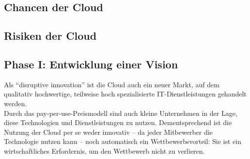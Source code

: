 \subsection{Chancen der Cloud}

\subsection{Risiken der Cloud}




\subsection{Phase I: Entwicklung einer Vision}
\label{cha:phaseI}

Als "`disruptive innovation"' ist die Cloud auch ein neuer Markt, auf dem 
qualitativ hochwertige, teilweise hoch spezialisierte IT-Dienstleistungen 
gehandelt werden. 
 \\
Durch das pay-per-use-Preismodell sind auch kleine Unternehmen in der Lage, 
diese Technologien und Dienstleistungen zu nutzen. 
 Dementsprechend ist die Nutzung der Cloud per se 
weder  innovativ -- da jeder Mitbewerber die Technologie nutzen kann -- noch 
automatisch ein Wettbewerbsvorteil: Sie ist ein wirtschaftliches Erfordernis, 
um den Wettbewerb nicht zu verlieren. 

